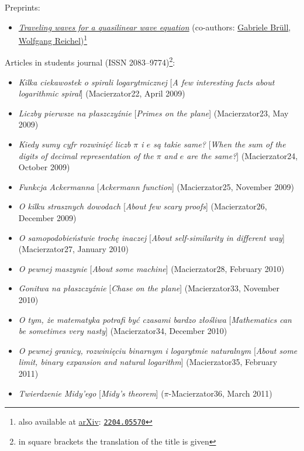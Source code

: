 \noindent Preprints:
\begin{itemize}
  \item \textsl{\href{https://www.waves.kit.edu/downloads/CRC1173_Preprint_2022-22.pdf}{Traveling waves for a quasilinear wave equation}} (co-authors: \href{https://gabrielebruell.wordpress.com/}{Gabriele Brüll}, \href{\urlReichel}{Wolfgang Reichel})\footnote{also available at \href{https://arxiv.org/abs/2204.05570}{arXiv}: \href{https://arxiv.org/pdf/2204.05570.pdf}{\texttt{2204.05570}}}
\end{itemize}

\noindent Articles in students journal \macierzator{} (ISSN 2083--9774)\footnote{in square brackets the translation of the title is given}:
\begin{itemize}
  \item \textsl{Kilka ciekawostek o spirali logarytmicznej} [\textsl{A few interesting facts about logarithmic spiral}] (Macierzator22, April 2009)
  \item \textsl{Liczby pierwsze na płaszczyźnie} [\textsl{Primes on the plane}] (Macierzator23, May 2009)
  \item \textsl{Kiedy sumy cyfr rozwinięć liczb $\pi$ i $e$ są takie same?} [\textsl{When the sum of the digits of decimal representation of the $\pi$ and $e$ are the same?}] (Macierzator24, October 2009)
  \item \textsl{Funkcja Ackermanna} [\textsl{Ackermann function}] (Macierzator25, November 2009)
  \item \textsl{O kilku strasznych dowodach} [\textsl{About few scary proofs}] (Macierzator26, December 2009)
  \item \textsl{O samopodobieństwie  trochę inaczej} [\textsl{About self-similarity in different way}] (Macierzator27, January 2010)
  \item \textsl{O pewnej maszynie} [\textsl{About some machine}] (Macierzator28, February 2010)
  \item \textsl{Gonitwa na płaszczyźnie} [\textsl{Chase on the plane}] (Macierzator33, November 2010)
  \item \textsl{O tym, że matematyka potrafi być czasami bardzo złośliwa} [\textsl{Mathematics can be sometimes very nasty}] (Macierzator34, December 2010)
  \item \textsl{O pewnej granicy, rozwinięciu binarnym i logarytmie naturalnym} [\textsl{About some limit, binary expansion and natural logarithm}] (Macierzator35, February 2011)
  \item \textsl{Twierdzenie Midy'ego} [\textsl{Midy's theorem}] ($\pi$-Macierzator36, March 2011)

\end{itemize}
